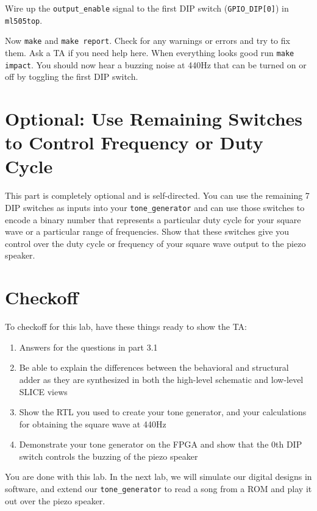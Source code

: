 \documentclass[11pt]{article}
\begin{document}
Wire up the \verb|output_enable| signal to the first DIP switch (\verb|GPIO_DIP[0]|) in \verb|ml505top|.

Now \verb|make| and \verb|make report|. Check for any warnings or errors and try to fix them. Ask a TA if you need help here. When everything looks good run \verb|make impact|. You should now hear a buzzing noise at 440Hz that can be turned on or off by toggling the first DIP switch.

\section{Optional: Use Remaining Switches to Control Frequency or Duty Cycle}
This part is completely optional and is self-directed. You can use the remaining 7 DIP switches as inputs into your \verb|tone_generator| and can use those switches to encode a binary number that represents a particular duty cycle for your square wave or a particular range of frequencies. Show that these switches give you control over the duty cycle or frequency of your square wave output to the piezo speaker.

\section{Checkoff}
To checkoff for this lab, have these things ready to show the TA:

\begin{enumerate}
	\item Answers for the questions in part 3.1
	\item Be able to explain the differences between the behavioral and structural adder as they are synthesized in both the high-level schematic and low-level SLICE views
	\item Show the RTL you used to create your tone generator, and your calculations for obtaining the square wave at 440Hz
	\item Demonstrate your tone generator on the FPGA and show that the 0th DIP switch controls the buzzing of the piezo speaker
\end{enumerate}

You are done with this lab. In the next lab, we will simulate our digital designs in software, and extend our \verb|tone_generator| to read a song from a ROM and play it out over the piezo speaker.
\end{document}
